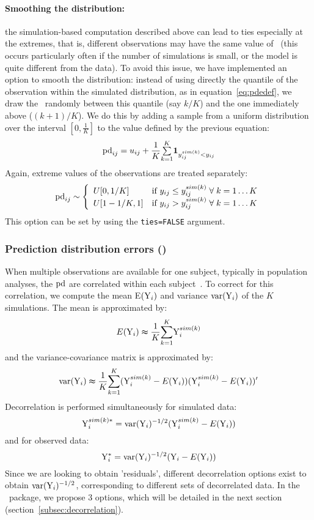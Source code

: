 \paragraph{Smoothing the distribution:} the simulation-based computation described above can lead to ties especially at the extremes, that is, different observations may have the same value of \pd~(this occurs particularly often if the number of simulations is small, or the model is quite different from the data). To avoid this issue, we have implemented an option to smooth the distribution: instead of using directly the quantile of the observation within the simulated distribution, as in equation~\ref{eq:pdedef}, we draw the \pd~randomly between this quantile (say $k/K$) and the one immediately above ($(k+1)/K$). We do this by adding a sample from a uniform distribution over the interval $\left[0,\frac{1}{K}\right]$ to the value defined by the previous equation:
\begin{equation}
{\rm pd}_{ij} = u_{ij} + \frac{1}{K}{\textstyle \overset{K}{\underset{k=1}{\sum}}\boldsymbol{1}_{y_{ij}^{sim(k)}<y_{ij}}} 
\end{equation}
Again, extreme values of the observations are treated separately:
\begin{equation*}
{\rm pd}_{ij} \sim \left\{ \begin{array}{l r}
            U[0,1/K] & \text{if } y_{ij} \leq y_{ij}^{sim(k)} \; \forall \; k=1\ldots K \\
            U[1-1/K,1] & \text{if } y_{ij} > y_{ij}^{sim(k)} \; \forall \; k=1\ldots K \\
           \end{array}
\right.
\end{equation*}
This option can be set by using the \texttt{ties=FALSE} argument.

\subsubsection{Prediction distribution errors (\pde)} 

\hskip 18pt When multiple observations are available for one subject, typically in population analyses, the ${\rm pd}$ are correlated within each subject~\cite{MentrePDE}. To correct for this correlation, we compute the mean E$({\rm Y}_i)$ and variance $\hbox{var}({\rm Y}_i)$ of the $K$ simulations. The mean is approximated by: 
$$E({\rm Y}_{i})\thickapprox\frac{1}{K}\overset{K}{\underset{k=1}{\sum}}{\rm Y}_{i}^{sim(k)}$$
and the variance-covariance matrix is approximated by:
$$\hbox{var}({\rm Y}_{i})\thickapprox \frac{1}{K}\overset{K}{\underset{k=1}{\sum}}({\rm Y}_{i}^{sim(k)}-E({\rm Y}_{i}))({\rm Y}_{i}^{sim(k)}-E({\rm Y}_{i}))'$$
Decorrelation is performed simultaneously for simulated data:
$$ {\rm Y}_{i}^{sim(k)*}= \hbox{var}({\rm Y}_i)^{-1/2} ({\rm Y}_{i}^{sim(k)}-E({\rm Y}_i))$$
and for observed data:
$$ {\rm Y}_{i}^*= \hbox{var}({\rm Y}_i)^{-1/2} ({\rm Y}_{i}-E({\rm Y}_i))$$
Since we are looking to obtain 'residuals', different decorrelation options exist to obtain $\hbox{var}({\rm Y}_i)^{-1/2}$, corresponding to different sets of decorrelated data. In the \npde~package, we propose 3 options, which will be detailed in the next section (section~\ref{subsec:decorrelation}).

